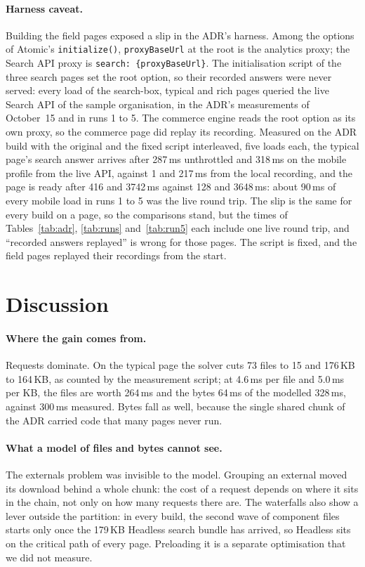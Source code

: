 \documentclass[11pt]{article}
\newcommand{\code}[1]{\texttt{#1}}
\begin{document}
\paragraph{Harness caveat.}\label{sec:harness-caveat}
Building the field pages exposed a slip in the ADR's harness. Among the options of Atomic's \code{initialize()}, \code{proxyBaseUrl} at the root is the analytics proxy; the Search API proxy is \code{search: \{proxyBaseUrl\}}. The initialisation script of the three search pages set the root option, so their recorded answers were never served: every load of the search-box, typical and rich pages queried the live Search API of the sample organisation, in the ADR's measurements of October~15 and in runs 1 to 5. The commerce engine reads the root option as its own proxy, so the commerce page did replay its recording. Measured on the ADR build with the original and the fixed script interleaved, five loads each, the typical page's search answer arrives after 287\,ms unthrottled and 318\,ms on the mobile profile from the live API, against 1 and 217\,ms from the local recording, and the page is ready after 416 and 3742\,ms against 128 and 3648\,ms: about 90\,ms of every mobile load in runs 1 to 5 was the live round trip. The slip is the same for every build on a page, so the comparisons stand, but the times of Tables~\ref{tab:adr}, \ref{tab:runs} and~\ref{tab:run5} each include one live round trip, and ``recorded answers replayed'' is wrong for those pages. The script is fixed, and the field pages replayed their recordings from the start.

\section{Discussion}\label{sec:discussion}

\paragraph{Where the gain comes from.} Requests dominate. On the typical page the solver cuts 73 files to 15 and 176\,KB to 164\,KB, as counted by the measurement script; at 4.6\,ms per file and 5.0\,ms per KB, the files are worth 264\,ms and the bytes 64\,ms of the modelled 328\,ms, against 300\,ms measured. Bytes fall as well, because the single shared chunk of the ADR carried code that many pages never run.

\paragraph{What a model of files and bytes cannot see.} The externals problem was invisible to the model. Grouping an external moved its download behind a whole chunk: the cost of a request depends on where it sits in the chain, not only on how many requests there are. The waterfalls also show a lever outside the partition: in every build, the second wave of component files starts only once the 179\,KB Headless search bundle has arrived, so Headless sits on the critical path of every page. Preloading it is a separate optimisation that we did not measure.
\end{document}
